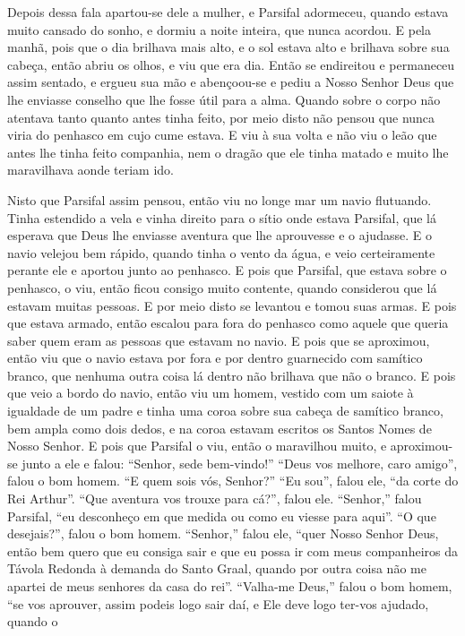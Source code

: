 Depois dessa fala apartou-se dele a mulher, e Parsifal adormeceu, quando
estava muito cansado do sonho, e dormiu a noite inteira, que nunca acordou. E
pela manhã, pois que o dia brilhava mais alto, e o sol estava alto e brilhava
sobre sua cabeça, então abriu os olhos, e viu que era dia. Então se endireitou
e permaneceu assim sentado, e ergueu sua mão e abençoou-se e pediu a Nosso
Senhor Deus que lhe enviasse conselho que lhe fosse útil para a alma. Quando
sobre o corpo não atentava tanto quanto antes tinha feito, por meio disto não
pensou que nunca viria do penhasco em cujo cume estava. E viu à sua volta e não
viu o leão que antes lhe tinha feito companhia, nem o dragão que ele tinha
matado e muito lhe maravilhava aonde teriam ido. 

Nisto que Parsifal assim pensou, então viu no longe mar um navio flutuando.
Tinha estendido a vela e vinha direito para o sítio onde estava Parsifal, que
lá esperava que Deus lhe enviasse aventura que lhe aprouvesse e o ajudasse. E o
navio velejou bem rápido, quando tinha o vento da água, e veio certeiramente
perante ele e aportou junto ao penhasco. E pois que Parsifal, que estava sobre
o penhasco, o viu, então ficou consigo muito contente, quando considerou que lá
estavam muitas pessoas. E por meio disto se levantou e tomou suas armas. E pois
que estava armado,  então escalou para fora do penhasco como aquele que queria
saber quem eram as pessoas que estavam no navio. E pois que se aproximou, então
viu que o navio estava por fora e por dentro guarnecido com samítico branco,
que nenhuma outra coisa lá dentro não brilhava que não o branco. E pois que
veio a bordo do navio, então viu um homem, vestido com um saiote à igualdade de
um padre e tinha uma coroa sobre sua cabeça de samítico branco, bem ampla como
dois dedos, e na coroa estavam escritos os Santos Nomes de Nosso Senhor. E pois
que Parsifal o viu, então o maravilhou muito, e aproximou-se junto a ele e
falou: “Senhor, sede bem-vindo!” “Deus vos melhore, caro amigo”, falou o bom
homem. “E quem sois vós, Senhor?” “Eu sou”, falou ele, “da corte do Rei
Arthur”. “Que aventura vos trouxe para cá?”, falou ele. “Senhor,” falou
Parsifal, “eu desconheço em que medida ou como eu viesse para aqui”. “O que
desejais?”, falou o bom homem. “Senhor,” falou ele, “quer Nosso Senhor Deus,
então bem quero que eu consiga sair e que eu possa ir com meus companheiros da
Távola Redonda à demanda do Santo Graal, quando por outra coisa não me apartei
de meus senhores da casa do rei”. “Valha-me Deus,” falou o bom homem, “se vos
aprouver, assim podeis logo sair daí, e Ele deve logo ter-vos ajudado, quando o
